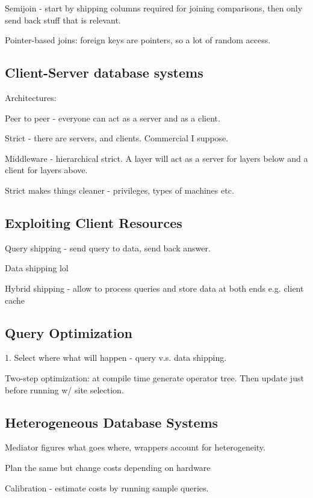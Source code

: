 \documentclass{article}
\begin{document}
		Semijoin - start by shipping columns required for joining comparisons, then only send back stuff that is relevant.
		
		Pointer-based joins: foreign keys are pointers, so a lot of random access.
		
	\subsection{Client-Server database systems}
	
		Architectures:
		
		Peer to peer - everyone can act as a server and as a client.
		
		Strict - there are servers, and clients. Commercial I suppose.
		
		Middleware - hierarchical strict. A layer will act as a server for layers below and a client for layers above.
		
		Strict makes things cleaner - privileges, types of machines etc.
		
	\subsection{Exploiting Client Resources}
	
		Query shipping - send query to data, send back answer.
		
		Data shipping lol
		
		Hybrid shipping - allow to process queries and store data at both ends e.g. client cache
		
	\subsection{Query Optimization}
	
		1. Select where what will happen - query v.s. data shipping.
		
		Two-step optimization: at compile time generate operator tree. Then update just before running w/ site selection.
		
	\subsection{Heterogeneous Database Systems}
	
		Mediator figures what goes where, wrappers account for heterogeneity.
		
		Plan the same but change costs depending on hardware
		
		Calibration - estimate costs by running sample queries.
		
\end{document}
